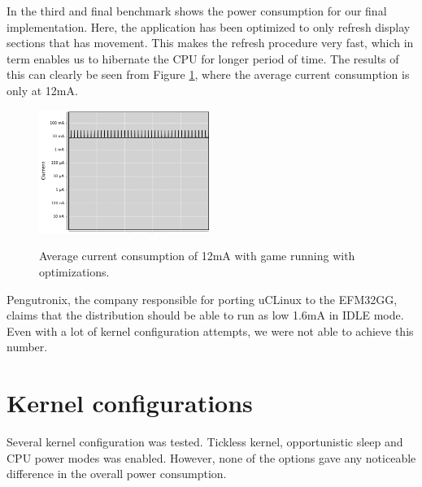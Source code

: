 In the third and final benchmark shows the power consumption for our final implementation. Here, the application has been optimized to only refresh display sections that has movement. This makes the refresh procedure very fast, which in term enables us to hibernate the CPU for longer period of time. The results of this can clearly be seen from Figure \ref{fig:opt}, where the average current consumption is only at 12mA. 

\begin{figure}[h]
\centering
\includegraphics[width=0.5\textwidth]{images/welcome_opt.png}
\label{fig:opt}
\caption{Average current consumption of 12mA with game running with optimizations.}
\end{figure}

Pengutronix, the company responsible for porting uCLinux to the EFM32GG, claims that the distribution should be able to run as low 1.6mA in IDLE mode. Even with a lot of kernel configuration attempts, we were not able to achieve this number. 

\section{Kernel configurations}

Several kernel configuration was tested. Tickless kernel, opportunistic sleep and CPU power modes was enabled. However, none of the options gave any noticeable difference in the overall power consumption.  